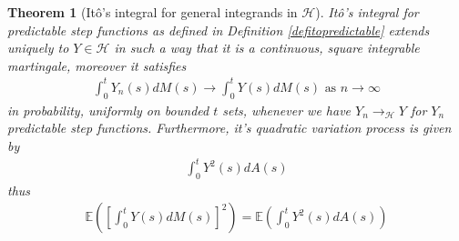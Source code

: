 \documentclass[11pt,a4paper, final]{article}
\newtheorem{thm}{Theorem}[section]
\begin{document}
\begin{thm}[Itô's integral for general integrands in $\mathcal{H}$] Itô's integral for predictable step functions as defined in Definition \ref{defitopredictable} extends uniquely to $Y \in \mathcal{H}$ in such a way that it is a continuous, square integrable martingale, moreover it satisfies 
\begin{align*}
\int_0^t Y_n(s) dM(s) \to \int_0^t Y(s) dM(s) \text{ as } n \to \infty
\end{align*}
in probability, uniformly on bounded $t$ sets, whenever we have $Y_n \to_\mathcal{H} Y$ for $Y_n$ predictable step functions. Furthermore, it's quadratic variation process is given by 
\begin{align*}
\int_0^t Y^2(s) dA(s)
\end{align*}
thus 
\begin{align*}
\mathbb{E} \left( \left[ \int_0^t Y(s) dM(s) \right]^2 \right) = \mathbb{E} \left( \int_0^t Y^2(s) dA(s) \right) 
\end{align*}
\end{thm}
\newpage
\end{document}
